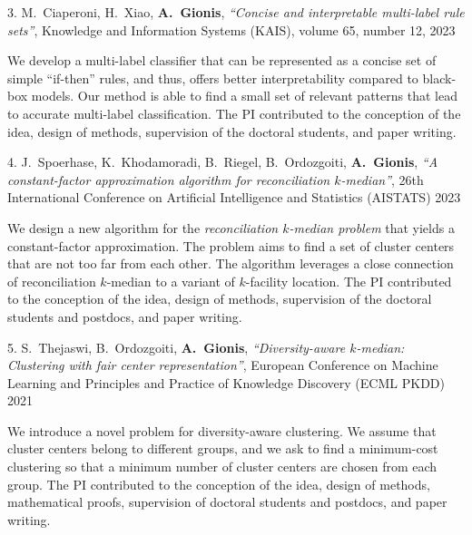 \documentclass[a4paper,11pt]{article}
\begin{document}
\textbibspace

\item[{3.}]
{ M.\ Ciaperoni, H.\ Xiao, \textbf{A.\ Gionis}},
{\em ``Concise and interpretable multi-label rule sets''}, 
Knowledge and Information Systems (KAIS),
volume 65, number 12, 2023
%
\item[]
We develop a multi-label classifier that can be represented as a concise set of simple ``if-then'' rules, 
and thus, offers better interpretability compared to black-box models. 
Our method is able to find a small set of relevant patterns that lead to accurate multi-label classification.
The PI contributed to the conception of the idea, 
design of methods, supervision of the doctoral students, and paper writing.

\textbibspace

\item[{4.}]
{J.\ Spoerhase, K.\ Khodamoradi, B.\ Riegel, B.\ Ordozgoiti, \textbf{A.\ Gionis}},
{\em ``A constant-factor approximation algorithm for reconciliation $k$-median''}, 
26th International Conference on Artificial Intelligence and Statistics (AISTATS) 2023
%
\item[]
We design a new algorithm for the \emph{reconciliation $k$-median problem} 
that yields a constant-factor approximation. 
The problem aims to find a set of cluster centers that are not too far from each other. 
The algorithm leverages a close connection of reconciliation $k$-median to a variant 
of $k$-facility location.
The PI contributed to the conception of the idea, 
design of methods, supervision of the doctoral students and postdocs, and paper writing.

\textbibspace

\item[{5.}]
{S.\ Thejaswi, B.\ Ordozgoiti, \textbf{A.\ Gionis}},
{\em ``Diversity-aware $k$-median: Clustering with fair center representation''},
European Conference on Machine Learning and Principles and Practice of Knowledge Discovery (ECML PKDD) 2021 
%
\item[]
We introduce a novel problem for diversity-aware clustering. 
We assume that cluster centers belong to different groups, 
and we ask to find a minimum-cost clustering so that 
a minimum number of cluster centers are chosen from each group. 
The PI contributed to the conception of the idea, 
design of methods, mathematical proofs, supervision of doctoral students and postdocs, and paper writing.
\end{document}

